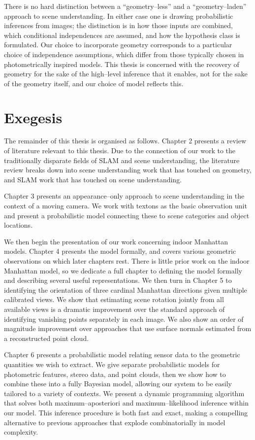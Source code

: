 There is no hard distinction between a ``geometry--less'' and a
``geometry--laden'' approach to scene understanding. In either case
one is drawing probabilistic inferences from images; the distinction
is in how those inputs are combined, which conditional independences
are assumed, and how the hypothesis class is formulated. Our choice to
incorporate geometry corresponds to a particular choice of
independence assumptions, which differ from those typically chosen in
photometrically inspired models. This thesis is concerned with the
recovery of geometry for the sake of the high--level inference that it
enables, not for the sake of the geometry itself, and our choice of
model reflects this.

\section{Exegesis}

The remainder of this thesis is organised as follows. Chapter 2
presents a review of literature relevant to this thesis. Due to the
connection of our work to the traditionally disparate fields of SLAM
and scene understanding, the literature review breaks down into scene
understanding work that has touched on geometry, and SLAM work that
has touched on scene understanding.

Chapter 3 presents an appearance--only approach to scene understanding
in the context of a moving camera. We work with textons as the basic
observation unit and present a probabilistic model connecting these to
scene categories and object locations.

We then begin the presentation of our work concerning indoor Manhattan
models. Chapter 4 presents the model formally, and covers various
geometric observations on which later chapters rest. There is little
prior work on the indoor Manhattan model, so we dedicate a full
chapter to defining the model formally and describing several useful
representations. We then turn in Chapter 5 to identifying the
orientation of three cardinal Manhattan directions given multiple
calibrated views. We show that estimating scene rotation jointly from
all available views is a dramatic improvement over the standard
approach of identifying vanishing points separately in each image. We
also show an order of magnitude improvement over approaches that use
surface normals estimated from a reconstructed point cloud.

Chapter 6 presents a probabilistic model relating sensor data to the
geometric quantities we wish to extract. We give separate
probabilistic models for photometric features, stereo data, and point
clouds, then we show how to combine these into a fully Bayesian model,
allowing our system to be easily tailored to a variety of contexts. We
present a dynamic programming algorithm that solves both
maximum--aposteriori and maximum--likelihood inference within our
model. This inference procedure is both fast and exact, making a
compelling alternative to previous approaches that explode
combinatorially in model complexity.


